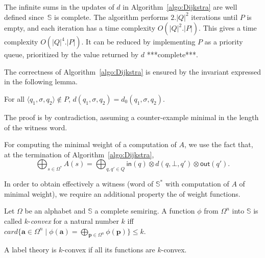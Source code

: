\documentclass[runningheads]{llncs}
\def\<#1>{\langle #1 \rangle}
\newcommand{\Semiring}{\mathbb{S}}
\begin{document}
\noindent
The infinite sums in the updates of $d$ in Algorithm~\ref{algo:Dijkstra} are well defined
since~$\Semiring$ is complete.
The algorithm performs $2.|Q|^2$ iterations until $P$ is empty, 
and each iteration has a time complexity $O(|Q|^2 . |P|)$.
This gives a time complexity $O(|Q|^4 . |P|)$. 
It can be reduced by implementing $P$ as a priority queue, 
prioritized by the value returned by $d$
***complete***. %

The correctness of Algorithm~\ref{algo:Dijkstra} 
is ensured by the invariant expressed in the following lemma.
\begin{lemma}
For all $\< q_1, \sigma, q_2> \notin P$, $d(q_1, \sigma, q_2) =  d_0(q_1, \sigma, q_2)$.
\end{lemma}
The proof is by contradiction, 
assuming a counter-example minimal in the length of the witness word.




\noindent
For computing the minimal weight of a computation of $A$, we use the fact that,
at the termination of Algorithm~\ref{algo:Dijkstra}, %
\[
  {\displaystyle \bigoplus_{s \in \Omega^*} A(s)} = 
  {\displaystyle\bigoplus_{q, q' \in Q}} \textstyle
  \mathsf{in}(q) \mathop{\otimes} d(q, \bot, q') \mathop{\otimes} \mathsf{out}(q').
\]

\noindent
In order to obtain effectively a witness 
(word of $\Semiring^*$ with computation of $A$ of minimal weight), 
we require an additional property the of weight functions.
\begin{definition}
Let $\Omega$ be an alphabet and $\Semiring$ a complete semiring.
A function $\phi$ from $\Omega^n$ into $\Semiring$
is called $k$-\emph{convex} for a natural number $k$ iff 
$\mathit{card}\{ \mathbf{a} \in \Omega^n \mid \phi(\mathbf{a}) = 
                 \displaystyle\bigoplus_{\mathbf{p} \in \Omega^n} \phi(\mathbf{p}) \} \leq k$.
\end{definition}
A label theory is $k$-convex if all its functions are $k$-convex.
\end{document}
